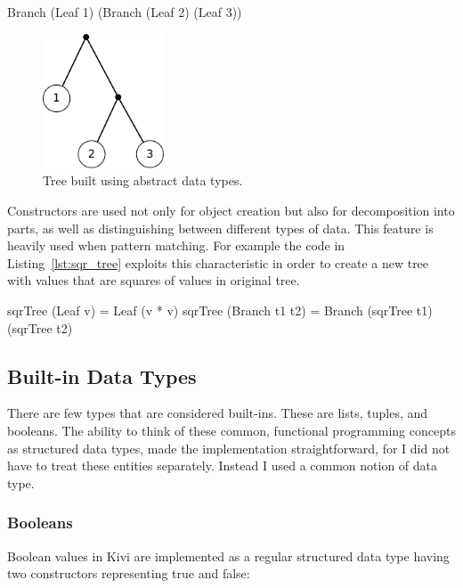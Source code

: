 \documentclass[12pt,a4paper]{report}
\begin{document}
\vspace*{0.2in}
\begin{code}[style=haskell]
  Branch (Leaf 1) (Branch (Leaf 2) (Leaf 3))
\end{code}

\begin{figure}[h!]
  \centering
  \includegraphics[height=4cm]{tree}
  \caption{Tree built using abstract data types.}
  \label{fig:tree}
\end{figure}

Constructors are used not only for object creation but also for decomposition
into parts, as well as distinguishing between different types of data. This
feature is heavily used when pattern matching. For example the code in
Listing~\ref{lst:sqr_tree} exploits this characteristic in order to create a
new tree with values that are squares of values in original tree.

\vspace*{0.2in}
\begin{code}[style=haskell,label=lst:sqr_tree,caption={Creating a `square rooted` tree.}]
  sqrTree (Leaf v) = Leaf (v * v)
  sqrTree (Branch t1 t2) = Branch (sqrTree t1) (sqrTree t2)
\end{code}

\subsection{Built-in Data Types}
There are few types that are considered built-ins. These are lists, tuples,
and booleans. The ability to think of these common, functional programming
concepts as structured data types, made the implementation straightforward,
for I did not have to treat these entities separately. Instead I used a common
notion of data type.
\subsubsection{Booleans}
Boolean values in Kivi are implemented as a regular structured data type having
two constructors representing true and false:
\end{document}
